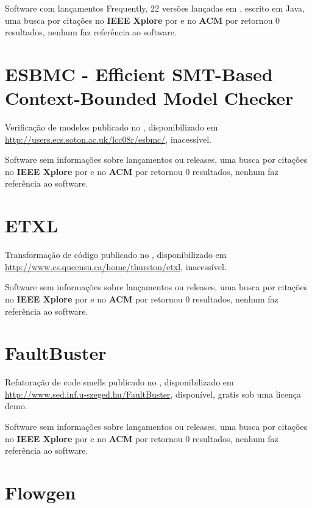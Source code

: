 Software com lançamentos Frequently,
22 versões lançadas
em ,
escrito em Java,
uma busca por citações no {\bf IEEE Xplore} por
\texttt{}
e no {\bf ACM} por
\texttt{}
retornou
0 resultados,
nenhum faz referência ao software.



\section{ESBMC - Efficient SMT-Based Context-Bounded Model Checker}

Verificação de modelos
publicado no  ,
disponibilizado em \url{http://users.ecs.soton.ac.uk/lcc08r/esbmc/},
inacessível.

Software sem informações sobre lançamentos ou releases,
uma busca por citações no {\bf IEEE Xplore} por
\texttt{}
e no {\bf ACM} por
\texttt{}
retornou
0 resultados,
nenhum faz referência ao software.



\section{ETXL}

Transformação de código
publicado no  ,
disponibilizado em \url{http://www.cs.queensu.ca/home/thurston/etxl},
inacessível.

Software sem informações sobre lançamentos ou releases,
uma busca por citações no {\bf IEEE Xplore} por
\texttt{}
e no {\bf ACM} por
\texttt{}
retornou
0 resultados,
nenhum faz referência ao software.



\section{FaultBuster}

Refatoração de code smells
publicado no  ,
disponibilizado em \url{http://www.sed.inf.u-szeged.hu/FaultBuster},
disponível,
gratis
sob uma licença demo.

Software sem informações sobre lançamentos ou releases,
uma busca por citações no {\bf IEEE Xplore} por
\texttt{}
e no {\bf ACM} por
\texttt{}
retornou
0 resultados,
nenhum faz referência ao software.



\section{Flowgen}

